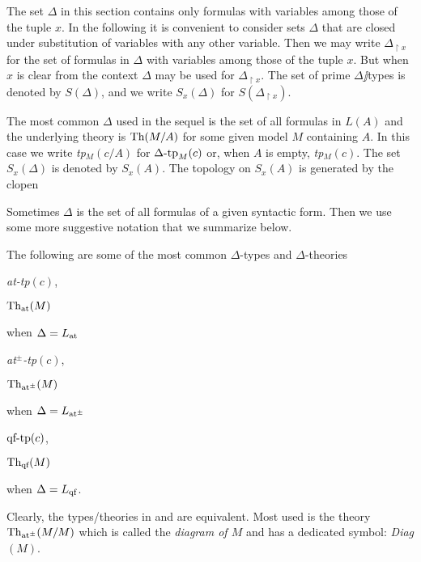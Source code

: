 \documentclass[creche.tex]{subfiles}
\begin{document}
The set $\Delta$ in this section contains only formulas with variables among those of the tuple $x$. In the following it is convenient to consider sets $\Delta$ that are closed under substitution of variables with any other variable. Then we may write \emph{$\Delta_{\restriction x}$} for the set of formulas in $\Delta$ with variables among those of the tuple $x$. But when $x$ is clear from the context $\Delta$ may be used for $\Delta_{\restriction x}$. The set of prime $\Delta\jj$types is denoted by \emph{$S(\Delta)$}, and we write \emph{$S_x(\Delta)$\/} for $S(\Delta_{\restriction x})$. 

The most common $\Delta$ used in the sequel is the set of all formulas in $L(A)$ and the underlying theory is $\textrm{Th}(M/A)$ for some given model $M$ containing $A$. In this case we write \emph{tp$_M(c/A)$} for $\Delta\mbox{-}\textrm{tp}_M(c)$ or, when $A$ is empty, \emph{tp$_M(c)$}. The set $S_x(\Delta)$ is denoted by $S_x(A)$. The topology on  $S_x(A)$ is generated by the clopen 


Sometimes $\Delta$ is the set of all formulas of a given syntactic form. Then we use some more suggestive notation that we summarize below.

\begin{notation}\label{note_tipi_diagramma}
The following are some of the most common $\Delta$-types and $\Delta$-theories
\def\ceq#1#2{\parbox[b]{15ex}{#1}\parbox[b]{14ex}{\hfill #2}}


\ceq{\hfill\emph{\textrm{at-tp}$(c)$},}{\emph{$\textrm{Th}_{\textrm{\scriptsize at}}(M)$\/}}\qquad when $\Delta=L_{\tiny\rm at}\hskip-.3ex$

\ceq{\hfill\emph{\textrm{at$^\pm$-tp}$(c)$},}{\emph{$\textrm{Th}_{\textrm{\scriptsize at}^\pm}(M)$\/}}\qquad when $\Delta=L_{{\tiny\rm at^\pm}}\hskip-.3ex$

\ceq{\hfill\emph{$\textrm{qf\mbox{-}tp}(c)$},}{\emph{$\textrm{Th}_{\textrm{\scriptsize qf}}(M)$\/}}\qquad when $\Delta=L_{\rm qf}$.

Clearly, the types/theories in  and  are equivalent. Most used is the theory $\textrm{Th}_{\textrm{\scriptsize at}^\pm}(M/M)$ which is called the \emph{diagram of $M$\/} and has a dedicated symbol: \emph{Diag$(M)$}.\QED
\end{notation}

\end{document}
